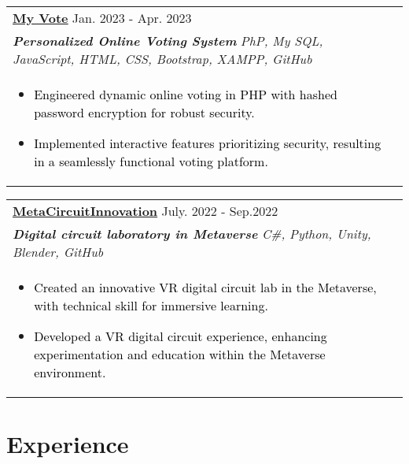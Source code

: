 \documentclass[a4paper,8pt]{article}
\begin{document}
\begin{tabularx}{\linewidth}{ @{}l r@{} }
\color[HTML]{1C033C} \textbf{\uline{\href{https://github.com/Himanshiprajapati/Online-Voting-System}{My Vote}}} \hfill \color[HTML]{371e77} Jan. 2023 - Apr. 2023\\[4pt]
\color[HTML]{371e77}\textbf{\textit{Personalized Online Voting System }} \hfill \color[HTML]{4B28A4} \textit{PhP, My SQL, JavaScript, HTML, CSS, Bootstrap, XAMPP, GitHub}\\[5pt]
\begin{minipage}[t]{\linewidth}
    \begin{itemize}[nosep,after=\strut, leftmargin=2em, itemsep=2pt]
        \item \textcolor{black}   {Engineered dynamic online voting in PHP with hashed password encryption for robust security.}
        \item \textcolor{black} {Implemented interactive features prioritizing security, resulting in a seamlessly functional voting platform.}
    \end{itemize}
    \end{minipage}\end{tabularx}

\begin{tabularx}{\linewidth}{ @{}l r@{} }
\color[HTML]{1C033C} \textbf{\uline{\href{https://github.com/Himanshiprajapati/MetaCircuit-Innovation}{MetaCircuitInnovation}}} \hfill \color[HTML]{371e77} July. 2022 - Sep.2022\\[4pt]
\color[HTML]{371e77}\textbf{\textit{Digital circuit 
       laboratory in Metaverse}} \hfill \color[HTML]{4B28A4} \textit{C\#, Python, Unity, Blender, GitHub}\\[5pt]
\begin{minipage}[t]{\linewidth}
    \begin{itemize}[nosep,after=\strut, leftmargin=2em, itemsep=2pt]
    \item \textcolor{black} {Created an innovative VR digital circuit lab in the Metaverse, with technical skill for immersive learning.}
    \item \textcolor{black}{Developed a VR digital circuit experience, enhancing experimentation and education within the Metaverse environment.}
\end{itemize}

    \end{minipage}\end{tabularx}
\vspace{-10pt} 
\section{Experience}
\end{document}
